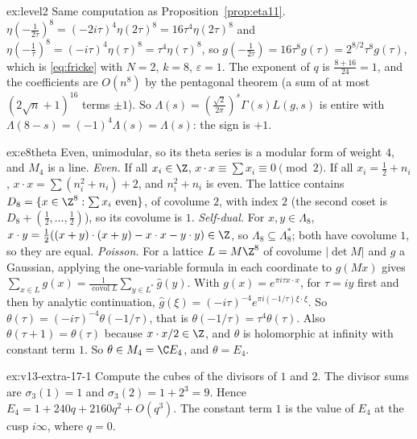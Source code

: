 \begin{solution}{ex:level2}
\idea Same computation as Proposition~\ref{prop:eta11}.
\writeup $\eta(-\frac1{2\tau})^8=(-2i\tau)^4\eta(2\tau)^8=16\tau^4\eta(2\tau)^8$ and $\eta(-\frac1\tau)^8=(-i\tau)^4\eta(\tau)^8=\tau^4\eta(\tau)^8$, so $g(-\frac1{2\tau})=16\tau^8g(\tau)=2^{8/2}\tau^8g(\tau)$,
which is \eqref{eq:fricke} with $N=2$, $k=8$, $\varepsilon=1$. The exponent of $q$ is $\frac{8+16}{24}=1$, and the coefficients are $O(n^8)$ by the pentagonal theorem (a sum of at most
$(2\sqrt n+1)^{16}$ terms $\pm1$). So $\Lambda(s)=(\frac{\sqrt2}{2\pi})^s\Gamma(s)L(g,s)$ is entire with $\Lambda(8-s)=(-1)^4\Lambda(s)=\Lambda(s)$: the sign is $+1$.
\end{solution}

\begin{solution}{ex:e8theta}
\idea Even, unimodular, so its theta series is a modular form of weight $4$, and $M_4$ is a line.
\writeup \emph{Even.} If all $x_i\in\Z$, $x\cdot x\equiv\sum x_i\equiv0\pmod2$. If all $x_i=\frac12+n_i$, $x\cdot x=\sum(n_i^2+n_i)+2$, and $n_i^2+n_i$ is even. The lattice
contains $D_8=\{x\in\Z^8:\sum x_i\text{ even}\}$, of covolume $2$, with index $2$ (the second coset is $D_8+(\frac12,\dots,\frac12)$), so its covolume is $1$.
\emph{Self-dual.} For $x,y\in\Lambda_8$, $x\cdot y=\frac12((x+y)\cdot(x+y)-x\cdot x-y\cdot y)\in\Z$, so $\Lambda_8\subseteq\Lambda_8^*$; both have covolume $1$, so they are equal.
\emph{Poisson.} For a lattice $L=M\Z^8$ of covolume $|\det M|$ and $g$ a Gaussian, applying the one-variable formula in each coordinate to $g(Mx)$ gives
$\sum_{x\in L}g(x)=\frac1{\operatorname{covol}L}\sum_{y\in L^*}\hat g(y)$. With $g(x)=e^{\pi i\tau x\cdot x}$, for $\tau=iy$ first and then by analytic continuation,
$\hat g(\xi)=(-i\tau)^{-4}e^{\pi i(-1/\tau)\xi\cdot\xi}$. So $\theta(\tau)=(-i\tau)^{-4}\theta(-1/\tau)$, that is $\theta(-1/\tau)=\tau^4\theta(\tau)$. Also $\theta(\tau+1)=\theta(\tau)$
because $x\cdot x/2\in\Z$, and $\theta$ is holomorphic at infinity with constant term $1$. So $\theta\in M_4=\C E_4$, and $\theta=E_4$.
\end{solution}

\begin{solution}{ex:v13-extra-17-1}
\idea Compute the cubes of the divisors of $1$ and $2$.
\writeup The divisor sums are $\sigma_3(1)=1$ and $\sigma_3(2)=1+2^3=9$. Hence $E_4=1+240q+2160q^2+O(q^3)$. The constant term $1$ is the value of $E_4$ at the cusp $i\infty$, where $q=0$.
\end{solution}

